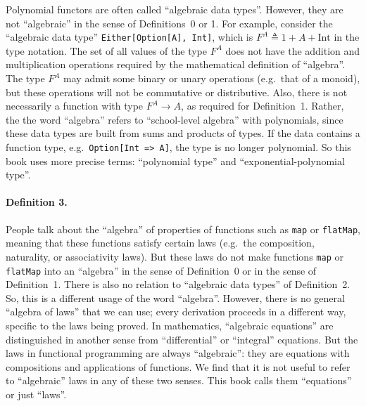 Polynomial functors are often called \textquotedblleft algebraic data
types\textquotedblright . However, they are not \textquotedblleft algebraic\textquotedblright{}
in the sense of Definitions~0 or 1. For example, consider the \textquotedblleft algebraic
data type\textquotedblright{} \lstinline!Either[Option[A], Int]!,
which is $F^{A}\triangleq1+A+\text{Int}$ in the type notation. The
set of all values of the type $F^{A}$ does not have the addition
and multiplication operations required by the mathematical definition
of \textsf{``}algebra\textsf{''}. The type $F^{A}$ may admit some binary or unary
operations (e.g.~that of a monoid), but these operations will not
be commutative or distributive. Also, there is not necessarily a function
with type $F^{A}\rightarrow A$, as required for Definition~1. Rather,
the the word \textsf{``}algebra\textsf{''} refers to \textsf{``}school-level algebra\textsf{''} with
polynomials, since these data types are built from sums and products
of types. If the data contains a function type, e.g.~\lstinline!Option[Int => A]!,
the type is no longer polynomial. So this book uses more precise terms:
\textquotedblleft polynomial type\textquotedblright{} and \textquotedblleft exponential-polynomial
type\textquotedblright .

\paragraph{Definition 3.}

People talk about the \textquotedblleft algebra\textquotedblright{}
of properties of functions such as \lstinline!map! or \lstinline!flatMap!,
meaning that these functions satisfy certain laws (e.g.~the composition,
naturality, or associativity laws). But these laws do not make functions
\lstinline!map! or \lstinline!flatMap! into an \textsf{``}algebra\textsf{''} in
the sense of Definition~0 or in the sense of Definition~1. There
is also no relation to \textquotedblleft algebraic data types\textquotedblright{}
of Definition~2. So, this is a different usage of the word \textsf{``}algebra\textsf{''}.
However, there is no general \textsf{``}algebra of laws\textsf{''} that we can use;
every derivation proceeds in a different way, specific to the laws
being proved. In mathematics, \textsf{``}algebraic equations\textsf{''} are distinguished
in another sense from \textsf{``}differential\textsf{''} or \textsf{``}integral\textsf{''} equations.
But the laws in functional programming are always \textsf{``}algebraic\textsf{''}:
they are equations with compositions and applications of functions.
We find that it is not useful to refer to \textsf{``}algebraic\textsf{''} laws in
any of these two senses. This book calls them \textsf{``}equations\textsf{''} or just
\textsf{``}laws\textsf{''}.


